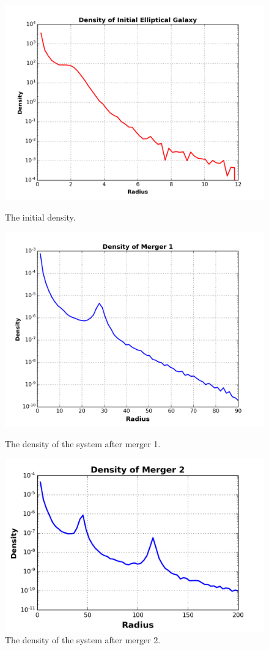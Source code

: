 \documentclass[12pt]{report}
\begin{document}
\begin{figure}[H]
  \includegraphics[width=\linewidth]{initial_density.png}
  \caption{The initial density.}
  \label{fig:density_initial}
\endminipage\hfill
{}
  \includegraphics[width=\linewidth]{density_merger1.png}
  \caption{The density of the system after merger 1.}\label{fig:density_merger1}
\endminipage\hfill
{}
  \includegraphics[width=\linewidth]{density_merger2.png}
  \caption{The density of the system after merger 2.}
  \label{fig:density_merger2}
\endminipage\hfill



\end{figure}
\end{document}
